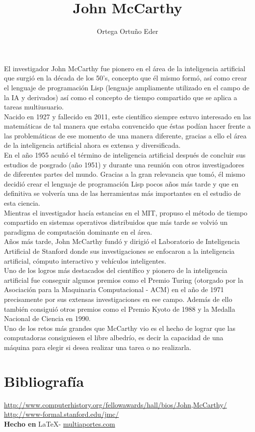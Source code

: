 \documentclass{article}
\title{John McCarthy}
\author{Ortega Ortu\~no Eder}
\date{} %
\begin{document}
	\maketitle
	\normalsize{
El investigador John McCarthy fue pionero en el área de la inteligencia artificial que surgió en la década de los 50's, concepto que él mismo formó, así como crear el lenguaje de programación Lisp (lenguaje ampliamente utilizado en el campo de la IA y derivados) así como el concepto de tiempo compartido que se aplica a tareas multiusuario.
\\

Nacido en 1927 y fallecido en 2011, este científico siempre estuvo interesado en las matemáticas de tal manera que estaba convencido que éstas podían hacer frente a las problemáticas de ese momento de una manera diferente, gracias a ello el área de la inteligencia artificial ahora es extensa y diversificada.
\\

En el año 1955 acuñó el término de inteligencia artificial después de concluir sus estudios de posgrado (año 1951) y durante una reunión con otros investigadores de diferentes partes del mundo. Gracias a la gran relevancia que tomó, él mismo decidió crear el lenguaje de programación Lisp pocos años más tarde y que en definitiva se volvería una de las herramientas más importantes en el estudio de esta ciencia.
\\

Mientras el investigador hacía estancias en el MIT, propuso el método de tiempo compartido en sistemas operativos distribuidos que más tarde se volvió un paradigma de computación dominante en el área.
\\

Años más tarde, John McCarthy fundó y dirigió el Laboratorio de Inteligencia Artificial de Stanford donde sus investigaciones se enfocaron a la inteligencia artificial, cómputo interactivo y vehículos inteligentes.
\\

Uno de los logros más destacados del científico y pionero de la inteligencia artificial fue conseguir algunos premios como el Premio Turing (otorgado por la Asociación para la Maquinaria Computacional - ACM) en el año de 1971 precisamente por sus extensas investigaciones en ese campo. Además de ello también consiguió otros premios como el Premio Kyoto de 1988 y la Medalla Nacional de Ciencia en 1990.
\\

Uno de los retos más grandes que McCarthy vio es el hecho de lograr que las computadoras consiguiesen el libre albedrío, es decir la capacidad de una máquina para elegir si desea realizar una tarea o no realizarla.

}

\vspace{1cm}

\section*{Bibliograf\'ia}

\noindent \url{http://www.computerhistory.org/fellowawards/hall/bios/John,McCarthy/}
\\
\noindent \url{http://www-formal.stanford.edu/jmc/}
\\

\large{\hfill \textbf{Hecho en } \LaTeX - \url{multiaportes.com}}
\end{document}
